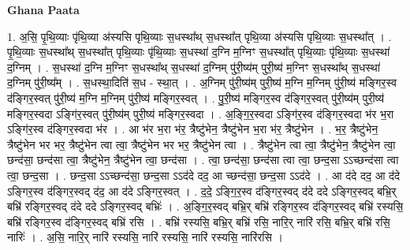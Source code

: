 \documentclass[17pt]{extarticle}
\begin{document}
\textbf{Ghana Paata } \newline

1. अ॒सि॒ पृ॒थि॒व्याः पृ॑थि॒व्या अ॑स्यसि पृथि॒व्याः स॒धस्था᳚थ् स॒धस्था᳚त् पृथि॒व्या अ॑स्यसि पृथि॒व्याः स॒धस्था᳚त् । . पृ॒थि॒व्याः स॒धस्था᳚थ् स॒धस्था᳚त् पृथि॒व्याः पृ॑थि॒व्याः स॒धस्था॑ द॒ग्नि म॒ग्निꣳ स॒धस्था᳚त् पृथि॒व्याः पृ॑थि॒व्याः स॒धस्था॑ द॒ग्निम् । . स॒धस्था॑ द॒ग्नि म॒ग्निꣳ स॒धस्था᳚थ् स॒धस्था॑ द॒ग्निम् पु॑री॒ष्य॑म् पुरी॒ष्य॑ म॒ग्निꣳ स॒धस्था᳚थ् स॒धस्था॑ द॒ग्निम् पु॑री॒ष्य᳚म् । . स॒धस्था॒दिति॑ स॒ध - स्था॒त् । . अ॒ग्निम् पु॑री॒ष्य॑म् पुरी॒ष्य॑ म॒ग्नि म॒ग्निम् पु॑री॒ष्य॑ मङ्गिर॒स्व द॑ङ्गिर॒स्वत् पु॑री॒ष्य॑ म॒ग्नि म॒ग्निम् पु॑री॒ष्य॑ मङ्गिर॒स्वत् । . पु॒री॒ष्य॑ मङ्गिर॒स्व द॑ङ्गिर॒स्वत् पु॑री॒ष्य॑म् पुरी॒ष्य॑ मङ्गिर॒स्वदा ऽङ्गि॑र॒स्वत् पु॑री॒ष्य॑म् पुरी॒ष्य॑ मङ्गिर॒स्वदा । . अ॒ङ्गि॒र॒स्वदा ऽङ्गि॑र॒स्व द॑ङ्गिर॒स्वदा भ॑र भ॒रा ऽङ्गि॑र॒स्व द॑ङ्गिर॒स्वदा भ॑र । . आ भ॑र भ॒रा भ॑र॒ त्रैष्टु॑भेन॒ त्रैष्टु॑भेन भ॒रा भ॑र॒ त्रैष्टु॑भेन । . भ॒र॒ त्रैष्टु॑भेन॒ त्रैष्टु॑भेन भर भर॒ त्रैष्टु॑भेन त्वा त्वा॒ त्रैष्टु॑भेन भर भर॒ त्रैष्टु॑भेन त्वा । . त्रैष्टु॑भेन त्वा त्वा॒ त्रैष्टु॑भेन॒ त्रैष्टु॑भेन त्वा॒ छन्द॑सा॒ छन्द॑सा त्वा॒ त्रैष्टु॑भेन॒ त्रैष्टु॑भेन त्वा॒ छन्द॑सा । . त्वा॒ छन्द॑सा॒ छन्द॑सा त्वा त्वा॒ छन्द॒सा ऽऽच्छन्द॑सा त्वा त्वा॒ छन्द॒सा । . छन्द॒सा ऽऽच्छन्द॑सा॒ छन्द॒सा ऽऽद॑दे दद॒ आ च्छन्द॑सा॒ छन्द॒सा ऽऽद॑दे । . आ द॑दे दद॒ आ द॑दे ऽङ्गिर॒स्व द॑ङ्गिर॒स्वद् द॑द॒ आ द॑दे ऽङ्गिर॒स्वत् । . द॒दे॒ ऽङ्गि॒र॒स्व द॑ङ्गिर॒स्वद् द॑दे ददे ऽङ्गिर॒स्वद् बभ्रि॒र् बभ्रि॑ रङ्गिर॒स्वद् द॑दे ददे ऽङ्गिर॒स्वद् बभ्रिः॑ । . अ॒ङ्गि॒र॒स्वद् बभ्रि॒र् बभ्रि॑ रङ्गिर॒स्व द॑ङ्गिर॒स्वद् बभ्रि॑ रस्यसि॒ बभ्रि॑ रङ्गिर॒स्व द॑ङ्गिर॒स्वद् बभ्रि॑ रसि । . बभ्रि॑ रस्यसि॒ बभ्रि॒र् बभ्रि॑ रसि॒ नारि॒र् नारि॑ रसि॒ बभ्रि॒र् बभ्रि॑ रसि॒ नारिः॑ । . अ॒सि॒ नारि॒र् नारि॑ रस्यसि॒ नारि॑ रस्यसि॒ नारि॑ रस्यसि॒ नारि॑रसि । \newline
\end{document}
